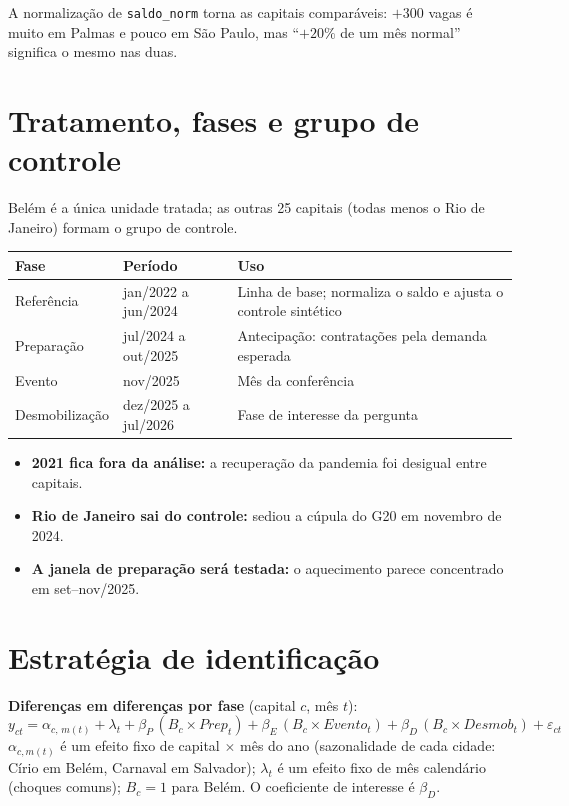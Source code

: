 \documentclass[11pt,a4paper]{article}
\newcommand{\var}[1]{\texttt{#1}}
\begin{document}
A normalização de \var{saldo\_norm} torna as capitais comparáveis: $+300$ vagas é muito em Palmas e
pouco em São Paulo, mas ``$+20\%$ de um mês normal'' significa o mesmo nas duas.

\section{Tratamento, fases e grupo de controle}

Belém é a única unidade tratada; as outras 25 capitais (todas menos o Rio de Janeiro) formam o grupo
de controle.

\begin{table}[H]
\centering\small
\begin{tabularx}{\linewidth}{p{3cm}p{3.6cm}L}
\toprule
\textbf{Fase} & \textbf{Período} & \textbf{Uso}\\
\midrule
Referência & jan/2022 a jun/2024 & Linha de base; normaliza o saldo e ajusta o controle sintético\\
Preparação & jul/2024 a out/2025 & Antecipação: contratações pela demanda esperada\\
Evento & nov/2025 & Mês da conferência\\
Desmobilização & dez/2025 a jul/2026 & Fase de interesse da pergunta\\
\bottomrule
\end{tabularx}
\end{table}

\begin{itemize}
  \item \textbf{2021 fica fora da análise:} a recuperação da pandemia foi desigual entre capitais.
  \item \textbf{Rio de Janeiro sai do controle:} sediou a cúpula do G20 em novembro de 2024.
  \item \textbf{A janela de preparação será testada:} o aquecimento parece concentrado em set--nov/2025.
\end{itemize}

\section{Estratégia de identificação}

\textbf{Diferenças em diferenças por fase} (capital $c$, mês $t$):
\begin{equation}
y_{ct} = \alpha_{c,\,m(t)} + \lambda_t + \beta_P\,(B_c \times Prep_t) + \beta_E\,(B_c \times Evento_t)
       + \beta_D\,(B_c \times Desmob_t) + \varepsilon_{ct}
\end{equation}
$\alpha_{c,m(t)}$ é um efeito fixo de capital $\times$ mês do ano (sazonalidade de cada cidade: Círio em
Belém, Carnaval em Salvador); $\lambda_t$ é um efeito fixo de mês calendário (choques comuns); $B_c = 1$
para Belém. O coeficiente de interesse é $\beta_D$.
\end{document}
